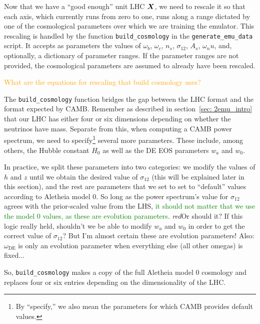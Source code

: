
Now that we have a ``good enough'' unit LHC $\bm{X}$, we need to rescale it 
so that each axis, which currently runs from zero to one, runs along a range 
dictated by one of the cosmological parameters over which we are training the 
emulator. This rescaling is handled by the function \verb|build_cosmology| in
the \verb|generate_emu_data| script. It accepts as parameters the values of
$\omega_b$, $\omega_c$, $n_s$, $\sigma_{12}$, $A_s$, $\omega_nu$, and, 
optionally, a dictionary of parameter ranges. If the
parameter ranges are not provided, the cosmological parameters are assumed to
already have been rescaled. 

\textcolor{orange}{What are the equations for rescaling that build cosmology
uses?}

The \verb|build_cosmology| function bridges the gap between the LHC format and 
the format expected by CAMB. Remember as described in
section~\ref{sec: 2emu_intro} that our LHC has either four or six dimensions 
depending on whether the neutrinos have mass. Separate from this, when 
computing a CAMB power spectrum, we need to
specify\footnote{By ``specify,'' we also mean the parameters for which CAMB
provides default values.}
several more parameters. These include, among others, the Hubble constant 
$H_0$ as well as the DE EOS parameters $w_a$ and $w_0$.

In practice, we split these parameters into two categories: we modify the
values of $h$ and $z$ until we obtain the desired value of $\sigma_{12}$
(this will be explained later in this section), and the rest are parameters
that we set to set to ``default'' values according to Aletheia model 0.
So long as the power spectrum's value for $\sigma_{12}$ agrees with the
prior-scaled value from the LHS, \textcolor{green}{it should not matter that 
we use the model 0 values, as these are evolution parameters}.
\textit{red}{Or should it? If this logic really held, shouldn't we be able to 
modify $w_a$ and $w_0$ in order to get the correct value of $\sigma_{12}$? But
I'm almost certain these are evolution parameters! Also: $\omega_\text{DE}$
is only an evolution parameter when everything else (all other omegas) is 
fixed...}

So, \verb|build_cosmology| makes a copy of the full Aletheia model 0 cosmology 
and replaces four or six entries depending on the dimensionality of the LHC. 

